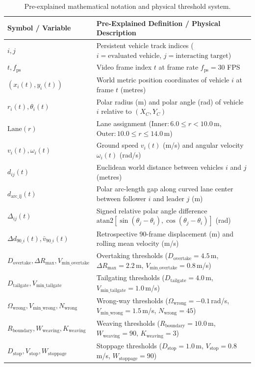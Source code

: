 \documentclass[12pt,a4paper]{report}
\begin{document}
\begin{table}[H]
\centering
\small
\caption{Pre-explained mathematical notation and physical threshold system.}
\label{tab:notation}
\begin{tabularx}{\textwidth}{l X}
\toprule
\textbf{Symbol / Variable} & \textbf{Pre-Explained Definition / Physical Description} \\
\midrule
$i, j$ & Persistent vehicle track indices ($i = \text{evaluated vehicle}$, $j = \text{interacting target}$) \\
$t, f_{\text{ps}}$ & Video frame index $t$ at frame rate $f_{\text{ps}} = 30$ FPS \\
$(x_i(t), y_i(t))$ & World metric position coordinates of vehicle $i$ at frame $t$ (metres) \\
$r_i(t), \theta_i(t)$ & Polar radius (m) and polar angle (rad) of vehicle $i$ relative to $(X_C, Y_C)$ \\
$\mathrm{Lane}(r)$ & Lane assignment ($\text{Inner}: 6.0 \le r < 10.0$\,m, $\text{Outer}: 10.0 \le r \le 14.0$\,m) \\
$v_i(t), \omega_i(t)$ & Ground speed $v_i(t)$ (m/s) and angular velocity $\omega_i(t)$ (rad/s) \\
$d_{ij}(t)$ & Euclidean world distance between vehicles $i$ and $j$ (metres) \\
$d_{\text{arc\_ij}}(t)$ & Polar arc-length gap along curved lane center between follower $i$ and leader $j$ (m) \\
$\Delta_{ij}(t)$ & Signed relative polar angle difference $\mathrm{atan2}[\sin(\theta_j-\theta_i), \cos(\theta_j-\theta_i)]$ (rad) \\
$\Delta d_{90\_i}(t), \bar{v}_{90\_i}(t)$ & Retrospective 90-frame displacement (m) and rolling mean velocity (m/s) \\
\midrule
$D_{\text{overtake}}, \Delta R_{\text{max}}, V_{\text{min\_overtake}}$ & Overtaking thresholds ($D_{\text{overtake}} = 4.5$\,m, $\Delta R_{\text{max}} = 2.2$\,m, $V_{\text{min\_overtake}} = 0.8$\,m/s) \\
$D_{\text{tailgate}}, V_{\text{min\_tailgate}}$ & Tailgating thresholds ($D_{\text{tailgate}} = 4.0$\,m, $V_{\text{min\_tailgate}} = 1.0$\,m/s) \\
$\Omega_{\text{wrong}}, V_{\text{min\_wrong}}, N_{\text{wrong}}$ & Wrong-way thresholds ($\Omega_{\text{wrong}} = -0.1$\,rad/s, $V_{\text{min\_wrong}} = 1.5$\,m/s, $N_{\text{wrong}} = 45$) \\
$R_{\text{boundary}}, W_{\text{weaving}}, K_{\text{weaving}}$ & Weaving thresholds ($R_{\text{boundary}} = 10.0$\,m, $W_{\text{weaving}} = 90$, $K_{\text{weaving}} = 3$) \\
$D_{\text{stop}}, V_{\text{stop}}, W_{\text{stoppage}}$ & Stoppage thresholds ($D_{\text{stop}} = 1.0$\,m, $V_{\text{stop}} = 0.8$\,m/s, $W_{\text{stoppage}} = 90$) \\
\bottomrule
\end{tabularx}
\end{table}
\end{document}
